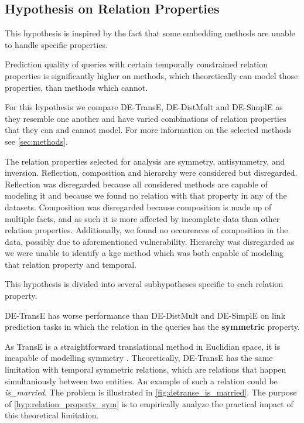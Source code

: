 \subsection{Hypothesis on Relation Properties}
\label{sec:hypothesis_relation_properties}

This hypothesis is inspired by the fact that some embedding methods are unable to handle specific properties.

%
%

\begin{hypothesis}
\label{hyp:relation_properties}
Prediction quality of queries with certain temporally constrained relation properties is significantly higher on methods, which theoretically can model those properties, than methods which cannot.
\end{hypothesis}

For this hypothesis we compare DE-TransE, DE-DistMult and DE-SimplE as they resemble one another and have varied combinations of relation properties that they can and cannot model.
For more information on the selected methods see \autoref{sec:methods}.

The relation properties selected for analysis are symmetry, antisymmetry, and inversion. Reflection, composition and hierarchy were considered but disregarded. 
Reflection was disregarded because all considered methods are capable of modeling it and because we found no relation with that property in any of the datasets.
Composition was disregarded because composition is made up of multiple facts, and as such it is more affected by incomplete data than other relation properties. Additionally, we found no occurences of composition in the data, possibly due to aforementioned vulnerability.
Hierarchy was disregarded as we were unable to identify a \gls{kge} method which was both capable of modeling that relation property and temporal.

This hypothesis is divided into several subhypotheses specific to each relation property.

\begin{subhypothesis}
\label{hyp:relation_property_sym}
DE-TransE has worse performance than DE-DistMult and DE-SimplE on link prediction tasks in which the relation in the queries has the \textbf{symmetric} property.
\end{subhypothesis}

As TransE is a straightforward translational method in Euclidian space, it is incapable of modelling symmetry \cite{goel19diachronicemb}. Theoretically, DE-TransE has the same limitation with temporal symmetric relations, which are relations that happen simultaniously between two entities. 
An example of such a relation could be \textit{is\_married}. The problem is illustrated in \autoref{fig:detranse_is_married}. 
The purpose of \autoref{hyp:relation_property_sym} is to empirically analyze the practical impact of this theoretical limitation.

